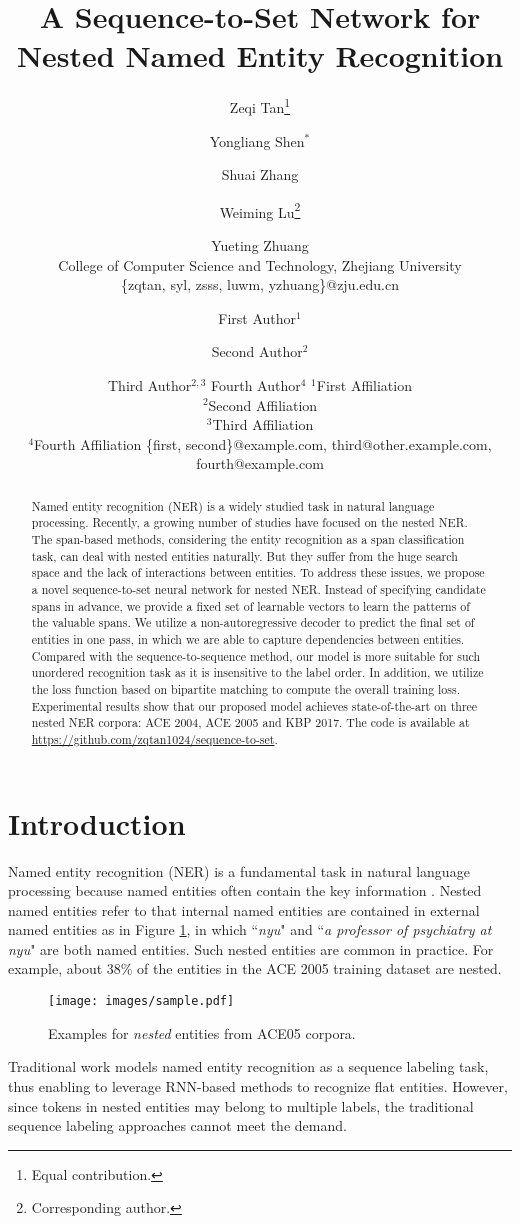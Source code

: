 \documentclass{article}
\title{A Sequence-to-Set Network for Nested Named Entity Recognition}
\author{
Zeqi Tan\footnote{Equal contribution.}
\and
Yongliang Shen$^\ast$
\and
Shuai Zhang
\and
Weiming Lu\footnote{Corresponding author.}
\and
Yueting Zhuang

\affiliations
College of Computer Science and Technology, Zhejiang University\\
\emails
\{zqtan, syl, zsss, luwm, yzhuang\}@zju.edu.cn
}
\author{
First Author$^1$
\and
Second Author$^2$\and
Third Author$^{2,3}$\And
Fourth Author$^4$
\affiliations
$^1$First Affiliation\\
$^2$Second Affiliation\\
$^3$Third Affiliation\\
$^4$Fourth Affiliation
\emails
\{first, second\}@example.com,
third@other.example.com,
fourth@example.com
}
\begin{document}
\maketitle

\begin{abstract}
Named entity recognition (NER) is a widely studied task in natural language processing. Recently, a growing number of studies have focused on the nested NER. The span-based methods, considering the entity recognition as a span classification task, can deal with nested entities naturally. But they suffer from the huge search space and the lack of interactions between entities. To address these issues, we propose a novel sequence-to-set neural network for nested NER. Instead of specifying candidate spans in advance, we provide a fixed set of learnable vectors to learn the patterns of the valuable spans. We utilize a non-autoregressive decoder to predict the final set of entities in one pass, in which we are able to capture dependencies between entities. Compared with the sequence-to-sequence method, our model is more suitable for such unordered recognition task as it is insensitive to the label order. In addition, we utilize the loss function based on bipartite matching to compute the overall training loss. Experimental results show that our proposed model achieves state-of-the-art on three nested NER corpora: ACE 2004, ACE 2005 and KBP 2017.
The code is available at \url{https://github.com/zqtan1024/sequence-to-set}.
\end{abstract}

\section{Introduction}
Named entity recognition (NER) is a fundamental task in natural language processing because named entities often contain the key information \cite{lample2016neural}. Nested named entities refer to that internal named entities are contained in external named entities as in Figure \ref{fig:example},  in which ``\textit{nyu}" and ``\textit{a professor of psychiatry at nyu}" are both named entities. Such nested entities are common in practice. For example, about 38\% of the entities in the ACE 2005 training dataset are nested. 
\begin{figure}[h]
  \centering
  \texttt{[image: images/sample.pdf]}
  \caption{Examples for \textit{nested} entities from ACE05 corpora.}
   \label{fig:example}
\end{figure}
Traditional work \cite{huang2015bidirectional,lample2016neural,chiu2016named} models named entity recognition as a sequence labeling task, thus enabling to leverage RNN-based methods to recognize flat entities. However, since tokens in nested entities may belong to multiple labels, the traditional sequence labeling approaches cannot meet the demand.
\end{document}
